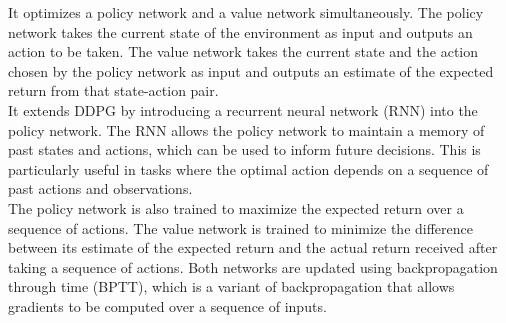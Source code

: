 \documentclass[preprint,12pt]{elsarticle}
\begin{document}
It optimizes a policy network and a value network simultaneously. The policy network takes the current state of the environment as input and outputs an action to be taken. The value network takes the current state and the action chosen by the policy network as input and outputs an estimate of the expected return from that state-action pair.\\

It extends DDPG by introducing a recurrent neural network (RNN) into the policy network. The RNN allows the policy network to maintain a memory of past states and actions, which can be used to inform future decisions. This is particularly useful in tasks where the optimal action depends on a sequence of past actions and observations.\\

The policy network is also trained to maximize the expected return over a sequence of actions. The value network is trained to minimize the difference between its estimate of the expected return and the actual return received after taking a sequence of actions. Both networks are updated using backpropagation through time (BPTT), which is a variant of backpropagation that allows gradients to be computed over a sequence of inputs.\\
\end{document}
